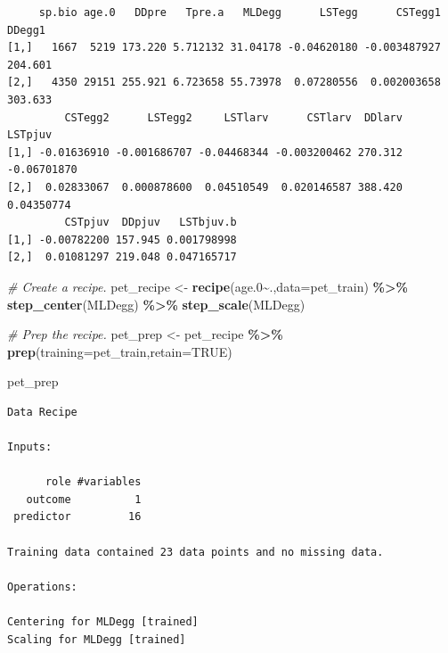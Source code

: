 \documentclass[
]{article}
\newenvironment{Shaded}{\begin{snugshade}}{\end{snugshade}}
\newcommand{\CommentTok}[1]{\textcolor[rgb]{0.56,0.35,0.01}{\textit{#1}}}
\newcommand{\DataTypeTok}[1]{\textcolor[rgb]{0.13,0.29,0.53}{#1}}
\newcommand{\FloatTok}[1]{\textcolor[rgb]{0.00,0.00,0.81}{#1}}
\newcommand{\KeywordTok}[1]{\textcolor[rgb]{0.13,0.29,0.53}{\textbf{#1}}}
\newcommand{\NormalTok}[1]{#1}
\newcommand{\OperatorTok}[1]{\textcolor[rgb]{0.81,0.36,0.00}{\textbf{#1}}}
\newcommand{\OtherTok}[1]{\textcolor[rgb]{0.56,0.35,0.01}{#1}}
\newcommand{\StringTok}[1]{\textcolor[rgb]{0.31,0.60,0.02}{#1}}
\begin{document}
\begin{verbatim}
     sp.bio age.0   DDpre   Tpre.a   MLDegg      LSTegg      CSTegg1  DDegg1
[1,]   1667  5219 173.220 5.712132 31.04178 -0.04620180 -0.003487927 204.601
[2,]   4350 29151 255.921 6.723658 55.73978  0.07280556  0.002003658 303.633
         CSTegg2      LSTegg2     LSTlarv      CSTlarv  DDlarv     LSTpjuv
[1,] -0.01636910 -0.001686707 -0.04468344 -0.003200462 270.312 -0.06701870
[2,]  0.02833067  0.000878600  0.04510549  0.020146587 388.420  0.04350774
         CSTpjuv  DDpjuv   LSTbjuv.b
[1,] -0.00782200 157.945 0.001798998
[2,]  0.01081297 219.048 0.047165717
\end{verbatim}

\begin{Shaded}
\begin{Highlighting}[]
\CommentTok{\#  Create a recipe.}
\NormalTok{pet\_recipe <{-}}\StringTok{ }\KeywordTok{recipe}\NormalTok{(age}\FloatTok{.0}\OperatorTok{\textasciitilde{}}\NormalTok{.,}\DataTypeTok{data=}\NormalTok{pet\_train) }\OperatorTok{\%>\%}\StringTok{ }
\StringTok{  }\KeywordTok{step\_center}\NormalTok{(MLDegg) }\OperatorTok{\%>\%}\StringTok{ }
\StringTok{  }\KeywordTok{step\_scale}\NormalTok{(MLDegg) }

\CommentTok{\#  Prep the recipe. }
\NormalTok{pet\_prep <{-}}\StringTok{ }\NormalTok{pet\_recipe }\OperatorTok{\%>\%}\StringTok{ }
\StringTok{  }\KeywordTok{prep}\NormalTok{(}\DataTypeTok{training=}\NormalTok{pet\_train,}\DataTypeTok{retain=}\OtherTok{TRUE}\NormalTok{)}

\NormalTok{pet\_prep}
\end{Highlighting}
\end{Shaded}

\begin{verbatim}
Data Recipe

Inputs:

      role #variables
   outcome          1
 predictor         16

Training data contained 23 data points and no missing data.

Operations:

Centering for MLDegg [trained]
Scaling for MLDegg [trained]
\end{verbatim}
\end{document}
